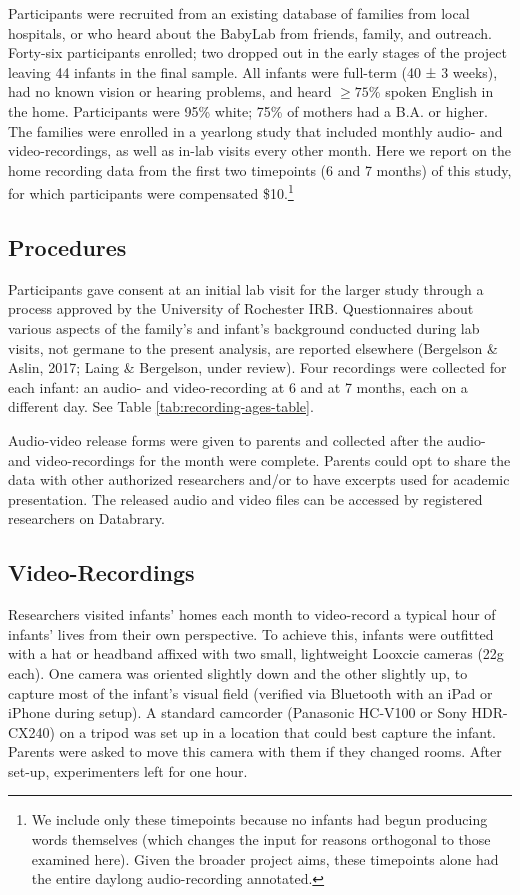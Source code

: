 \documentclass[man]{apa6}
\theoremstyle{definition}
\theoremstyle{definition}
\theoremstyle{definition}
\theoremstyle{remark}
\begin{document}
Participants were recruited from an existing database of families from
local hospitals, or who heard about the BabyLab from friends, family,
and outreach. Forty-six participants enrolled; two dropped out in the
early stages of the project leaving 44 infants in the final sample. All
infants were full-term (40 ± 3 weeks), had no known vision or hearing
problems, and heard \(\geq 75\%\) spoken English in the home.
Participants were 95\% white; 75\% of mothers had a B.A. or higher. The
families were enrolled in a yearlong study that included monthly audio-
and video-recordings, as well as in-lab visits every other month. Here
we report on the home recording data from the first two timepoints (6
and 7 months) of this study, for which participants were compensated
\$10.\footnote{We include only these timepoints because no infants had begun producing words themselves (which changes the input for reasons orthogonal to those examined here). Given the broader project aims, these timepoints alone had the entire daylong audio-recording annotated.}

\subsection{Procedures}\label{procedures}

Participants gave consent at an initial lab visit for the larger study
through a process approved by the University of Rochester IRB.
Questionnaires about various aspects of the family's and infant's
background conducted during lab visits, not germane to the present
analysis, are reported elsewhere (Bergelson \& Aslin, 2017; Laing \&
Bergelson, under review). Four recordings were collected for each
infant: an audio- and video-recording at 6 and at 7 months, each on a
different day. See Table \ref{tab:recording-ages-table}.

Audio-video release forms were given to parents and collected after the
audio- and video-recordings for the month were complete. Parents could
opt to share the data with other authorized researchers and/or to have
excerpts used for academic presentation. The released audio and video
files can be accessed by registered researchers on Databrary.

\subsection{Video-Recordings}\label{video-recordings}

Researchers visited infants' homes each month to video-record a typical
hour of infants' lives from their own perspective. To achieve this,
infants were outfitted with a hat or headband affixed with two small,
lightweight Looxcie cameras (22g each). One camera was oriented slightly
down and the other slightly up, to capture most of the infant's visual
field (verified via Bluetooth with an iPad or iPhone during setup). A
standard camcorder (Panasonic HC-V100 or Sony HDR-CX240) on a tripod was
set up in a location that could best capture the infant. Parents were
asked to move this camera with them if they changed rooms. After set-up,
experimenters left for one hour.
\end{document}
